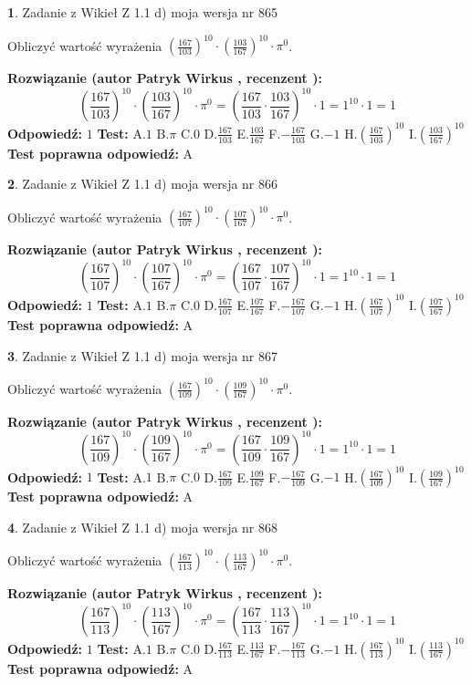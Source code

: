\documentclass[12pt, a4paper]{article}
\theoremstyle{definition} %
\newtheorem{zad}{}
\newcommand{\zadStart}[1]{\begin{zad}#1\newline}
\newcommand{\zadStop}{\end{zad}}
\newcommand{\rozwStart}[2]{\noindent \textbf{Rozwiązanie (autor #1 , recenzent #2): }\newline}
\newcommand{\rozwStop}{\newline}
\newcommand{\odpStart}{\noindent \textbf{Odpowiedź:}\newline}
\newcommand{\odpStop}{\newline}
\newcommand{\testStart}{\noindent \textbf{Test:}\newline}
\newcommand{\testStop}{\newline}
\newcommand{\kluczStart}{\noindent \textbf{Test poprawna odpowiedź:}\newline}
\newcommand{\kluczStop}{\newline}
\begin{document}
\zadStart{Zadanie z Wikieł Z 1.1 d) moja wersja nr 865}

Obliczyć wartość wyrażenia $(\frac{167}{103})^{10} \cdot (\frac{103}{167})^{10} \cdot \pi^{0}$.
\zadStop
\rozwStart{Patryk Wirkus}{}
$$(\frac{167}{103})^{10} \cdot (\frac{103}{167})^{10} \cdot \pi^{0} = (\frac{167}{103} \cdot \frac{103}{167})^{10} \cdot 1 = 1^{10} \cdot 1 = 1$$
\rozwStop
\odpStart
$1$
\odpStop
\testStart
A.$1$ B.$\pi$ C.$0$ D.$\frac{167}{103}$ E.$\frac{103}{167}$
F.$-\frac{167}{103}$ G.$-1$
H.$(\frac{167}{103})^{10}$
I.$(\frac{103}{167})^{10}$
\testStop
\kluczStart
A
\kluczStop



\zadStart{Zadanie z Wikieł Z 1.1 d) moja wersja nr 866}

Obliczyć wartość wyrażenia $(\frac{167}{107})^{10} \cdot (\frac{107}{167})^{10} \cdot \pi^{0}$.
\zadStop
\rozwStart{Patryk Wirkus}{}
$$(\frac{167}{107})^{10} \cdot (\frac{107}{167})^{10} \cdot \pi^{0} = (\frac{167}{107} \cdot \frac{107}{167})^{10} \cdot 1 = 1^{10} \cdot 1 = 1$$
\rozwStop
\odpStart
$1$
\odpStop
\testStart
A.$1$ B.$\pi$ C.$0$ D.$\frac{167}{107}$ E.$\frac{107}{167}$
F.$-\frac{167}{107}$ G.$-1$
H.$(\frac{167}{107})^{10}$
I.$(\frac{107}{167})^{10}$
\testStop
\kluczStart
A
\kluczStop



\zadStart{Zadanie z Wikieł Z 1.1 d) moja wersja nr 867}

Obliczyć wartość wyrażenia $(\frac{167}{109})^{10} \cdot (\frac{109}{167})^{10} \cdot \pi^{0}$.
\zadStop
\rozwStart{Patryk Wirkus}{}
$$(\frac{167}{109})^{10} \cdot (\frac{109}{167})^{10} \cdot \pi^{0} = (\frac{167}{109} \cdot \frac{109}{167})^{10} \cdot 1 = 1^{10} \cdot 1 = 1$$
\rozwStop
\odpStart
$1$
\odpStop
\testStart
A.$1$ B.$\pi$ C.$0$ D.$\frac{167}{109}$ E.$\frac{109}{167}$
F.$-\frac{167}{109}$ G.$-1$
H.$(\frac{167}{109})^{10}$
I.$(\frac{109}{167})^{10}$
\testStop
\kluczStart
A
\kluczStop



\zadStart{Zadanie z Wikieł Z 1.1 d) moja wersja nr 868}

Obliczyć wartość wyrażenia $(\frac{167}{113})^{10} \cdot (\frac{113}{167})^{10} \cdot \pi^{0}$.
\zadStop
\rozwStart{Patryk Wirkus}{}
$$(\frac{167}{113})^{10} \cdot (\frac{113}{167})^{10} \cdot \pi^{0} = (\frac{167}{113} \cdot \frac{113}{167})^{10} \cdot 1 = 1^{10} \cdot 1 = 1$$
\rozwStop
\odpStart
$1$
\odpStop
\testStart
A.$1$ B.$\pi$ C.$0$ D.$\frac{167}{113}$ E.$\frac{113}{167}$
F.$-\frac{167}{113}$ G.$-1$
H.$(\frac{167}{113})^{10}$
I.$(\frac{113}{167})^{10}$
\testStop
\kluczStart
A
\kluczStop
\end{document}
